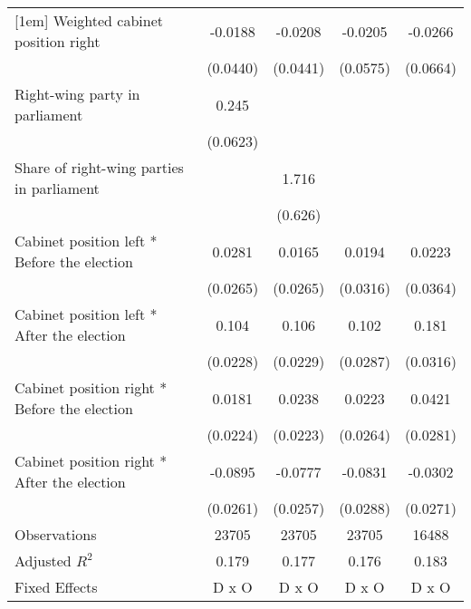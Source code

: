 \begin{table}[htbp]
\begin{tabular}{l*{4}{c}}
[1em]
Weighted cabinet position right&     -0.0188         &     -0.0208         &     -0.0205         &     -0.0266         \\
                    &    (0.0440)         &    (0.0441)         &    (0.0575)         &    (0.0664)         \\
[1em]
Right-wing party in parliament&       0.245\sym{***}&                     &                     &                     \\
                    &    (0.0623)         &                     &                     &                     \\
[1em]
Share of right-wing parties in parliament&                     &       1.716\sym{**} &                     &                     \\
                    &                     &     (0.626)         &                     &                     \\
[1em]
Cabinet position left * Before the election&      0.0281         &      0.0165         &      0.0194         &      0.0223         \\
                    &    (0.0265)         &    (0.0265)         &    (0.0316)         &    (0.0364)         \\
[1em]
Cabinet position left * After the election&       0.104\sym{***}&       0.106\sym{***}&       0.102\sym{***}&       0.181\sym{***}\\
                    &    (0.0228)         &    (0.0229)         &    (0.0287)         &    (0.0316)         \\
[1em]
Cabinet position right * Before the election&      0.0181         &      0.0238         &      0.0223         &      0.0421         \\
                    &    (0.0224)         &    (0.0223)         &    (0.0264)         &    (0.0281)         \\
[1em]
Cabinet position right * After the election&     -0.0895\sym{**} &     -0.0777\sym{**} &     -0.0831\sym{**} &     -0.0302         \\
                    &    (0.0261)         &    (0.0257)         &    (0.0288)         &    (0.0271)         \\
\hline
Observations        &       23705         &       23705         &       23705         &       16488         \\
Adjusted \(R^{2}\)  &       0.179         &       0.177         &       0.176         &       0.183         \\
Fixed Effects       &       D x O         &       D x O         &       D x O         &       D x O         \\

\end{tabular}
\end{table}
